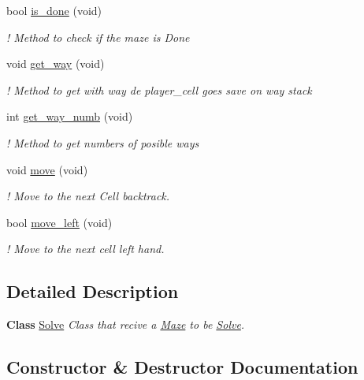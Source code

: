 \begin{DoxyCompactItemize}
bool \hyperlink{classSolve_a868db181d288fdb10e5592b62e669c3b}{is\+\_\+done} (void)
\begin{DoxyCompactList}\small\item\em ! Method to check if the maze is Done \end{DoxyCompactList}\item 
void \hyperlink{classSolve_a963b593c0311f03c7e4ce77eea818fa1}{get\+\_\+way} (void)
\begin{DoxyCompactList}\small\item\em ! Method to get with way de player\+\_\+cell goes save on way stack \end{DoxyCompactList}\item 
int \hyperlink{classSolve_aaccff68d3e175f7400a9407077db7255}{get\+\_\+way\+\_\+numb} (void)
\begin{DoxyCompactList}\small\item\em ! Method to get numbers of posible ways \end{DoxyCompactList}\item 
void \hyperlink{classSolve_a8902b46862c7759928495e3684054f82}{move} (void)
\begin{DoxyCompactList}\small\item\em ! Move to the next Cell backtrack. \end{DoxyCompactList}\item 
bool \hyperlink{classSolve_a8226032eb1d4877539f417d4fab0efde}{move\+\_\+left} (void)
\begin{DoxyCompactList}\small\item\em ! Move to the next cell left hand. \end{DoxyCompactList}\end{DoxyCompactItemize}


\subsection{Detailed Description}
{\bfseries Class} \hyperlink{classSolve}{Solve} {\itshape Class that recive a \hyperlink{classMaze}{Maze} to be \hyperlink{classSolve}{Solve}.} 

\subsection{Constructor \& Destructor Documentation}
\mbox{\label{classSolve_a3aeaf8dfa8f2bb5f8fb4ec048b9afdb9}} 
